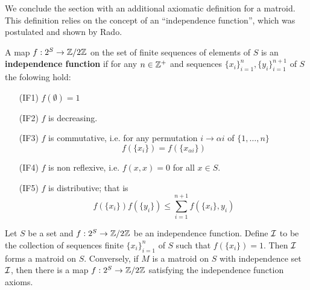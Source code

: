 We conclude the section with an additional axiomatic definition for a matroid. This definition
relies on the concept of an ``independence function'', which was postulated and shown by Rado.

\begin{definition}
    A map $f:2^S \rightarrow \mathbb{Z}/2\mathbb{Z}$ on the set of finite sequences of elements of  $S$ is an \textbf{independence
    function} if for any $n \in \mathbb{Z}^+$ and sequences  $\{x_i\}_{i=1}^{n}, \{y_i\}_{i=1}^{n+1}$ of $S$
    the folowing hold:
        \begin{enumerate}
            \item[(IF1)] $f(\emptyset)=1$

            \item[(IF2)] $f$ is decreasing.

            \item[(IF3)] $f$ is commutative, i.e. for any permutation $i \rightarrow \alpha i$ of
                $\{1,\dots, n\}$
                    \begin{equation}
                        f(\{x_i\})=f(\{x_{\alpha i}\})
                    \end{equation} 

            \item[(IF4)] $f$ is non reflexive, i.e.  $f(x,x)=0$ for all $x \in S$.

            \item[(IF5)] $f$ is distributive; that is 
                \begin{equation}
                    f(\{x_i\})f(\{y_i\}) \leq \sum_{i=1}^{n+1}{f(\{x_i\},y_i)}
                \end{equation}
        \end{enumerate}
\end{definition}

\begin{theorem}\label{1.1.7}
    Let $S$ be a set and $f:2^S \rightarrow \mathbb{Z}/2\mathbb{Z}$ be an independence function. Define  $\mathcal{I}$ to be
    the collection of sequences finite $\{x_i\}_{i=1}^{n}$ of $S$ such that $f(\{x_i\})=1$. Then
    $\mathcal{I}$ forms a matroid on  $S$. Conversely, if  $M$ is a matroid on  $S$ with independence set
    $\mathcal{I}$, then there is a map $f:2^S \rightarrow \mathbb{Z}/2\mathbb{Z}$ satisfying the independence function
    axioms.
\end{theorem}
